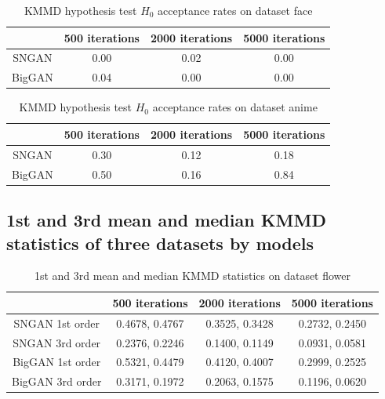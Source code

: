 \documentclass{article}
\begin{document}
\begin{table}[h!]
\centering
\caption{KMMD hypothesis test $H_0$ acceptance rates on dataset face}
 \begin{tabular}{||c | c | c | c||} 
 \hline
 & 500 iterations & 2000 iterations & 5000 iterations \\ [0.5ex] 
 \hline\hline
 SNGAN & 0.00 & 0.02 & 0.00 \\ 
 \hline
 BigGAN & 0.04 & 0.00 & 0.00 \\
 \hline
\end{tabular}
\end{table}

\begin{table}[h!]
\centering
\caption{KMMD hypothesis test $H_0$ acceptance rates on dataset anime}
 \begin{tabular}{||c | c | c | c||} 
 \hline
 & 500 iterations & 2000 iterations & 5000 iterations \\ [0.5ex] 
 \hline\hline
 SNGAN & 0.30 & 0.12 & 0.18 \\ 
 \hline
 BigGAN & 0.50 & 0.16 & 0.84 \\
 \hline
\end{tabular}
\end{table}


\subsection*{1st and 3rd mean and median KMMD statistics of three datasets by models}
\begin{table}[hbt!]
\centering
\caption{1st and 3rd mean and median KMMD statistics on dataset flower}
 \begin{tabular}{||c | c | c | c||} 
 \hline
 & 500 iterations & 2000 iterations & 5000 iterations \\ [0.5ex] 
 \hline\hline
 SNGAN 1st order & 0.4678, 0.4767 & 0.3525, 0.3428 & 0.2732, 0.2450 \\ 
 \hline
 SNGAN 3rd order & 0.2376, 0.2246 & 0.1400, 0.1149 & 0.0931, 0.0581 \\ 
 \hline
 BigGAN 1st order & 0.5321, 0.4479 & 0.4120, 0.4007 & 0.2999, 0.2525 \\
 \hline
 BigGAN 3rd order & 0.3171, 0.1972 & 0.2063, 0.1575 & 0.1196, 0.0620 \\
 \hline
\end{tabular}
\end{table}
\end{document}
